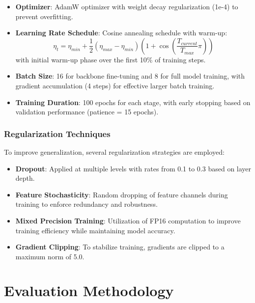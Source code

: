 \begin{itemize}
    \item \textbf{Optimizer}: AdamW optimizer with weight decay regularization (1e-4) to prevent overfitting.
    
    \item \textbf{Learning Rate Schedule}: Cosine annealing schedule with warm-up:
    \begin{equation}
        \eta_t = \eta_{min} + \frac{1}{2}(\eta_{max} - \eta_{min})\left(1 + \cos\left(\frac{T_{current}}{T_{max}}\pi\right)\right)
    \end{equation}
    with initial warm-up phase over the first 10\% of training steps.
    
    \item \textbf{Batch Size}: 16 for backbone fine-tuning and 8 for full model training, with gradient accumulation (4 steps) for effective larger batch training.
    
    \item \textbf{Training Duration}: 100 epochs for each stage, with early stopping based on validation performance (patience = 15 epochs).
\end{itemize}

\subsubsection{Regularization Techniques}
To improve generalization, several regularization strategies are employed:

\begin{itemize}
    \item \textbf{Dropout}: Applied at multiple levels with rates from 0.1 to 0.3 based on layer depth.
    
    \item \textbf{Feature Stochasticity}: Random dropping of feature channels during training to enforce redundancy and robustness.
    
    \item \textbf{Mixed Precision Training}: Utilization of FP16 computation to improve training efficiency while maintaining model accuracy.
    
    \item \textbf{Gradient Clipping}: To stabilize training, gradients are clipped to a maximum norm of 5.0.
\end{itemize}

\section{Evaluation Methodology}

